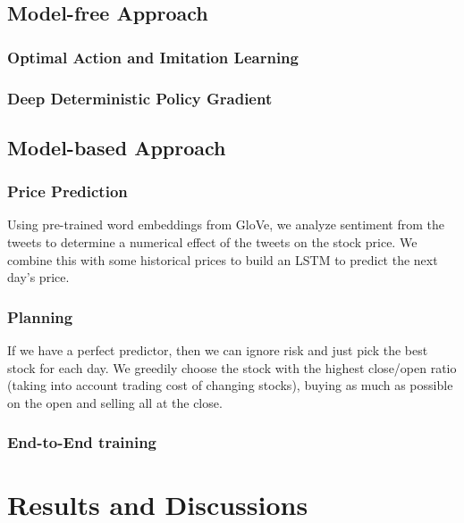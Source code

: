 \documentclass[a4paper, 10pt]{article}
\begin{document}
\begin{spacing}{1.2}
    \subsection{Model-free Approach}
    \subsubsection{Optimal Action and Imitation Learning}
    \subsubsection{Deep Deterministic Policy Gradient}
    
    
    \subsection{Model-based Approach}
    \subsubsection{Price Prediction}
    Using pre-trained word embeddings from GloVe, we analyze sentiment from the tweets to determine a numerical effect of the tweets on the stock price. We combine this with some historical prices to build an LSTM to predict the next day's price. 
    \subsubsection{Planning}
    If we have a perfect predictor, then we can ignore risk and just pick the best stock for each day. We greedily choose the stock with the highest close/open ratio (taking into account trading cost of changing stocks), buying as much as possible on the open and selling all at the close. 
    \subsubsection{End-to-End training}
    
    \section{Results and Discussions}
%    
    
    
  
  \end{spacing}  
  
  
\end{document}
